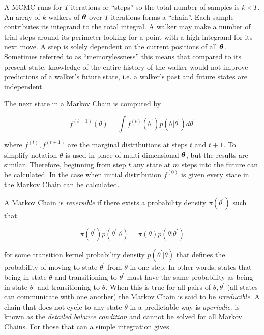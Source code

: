 A MCMC runs for $T$ iterations or ``steps'' so the total number of samples is $k \times T$.    An array of $k$ walkers of
$\boldsymbol{\theta}$ over $T$ iterations forms a ``chain''.  Each sample contributes its
integrand to the total integral.  A walker may make a number of trial steps around its perimeter looking for a point with a high
integrand for its next move.  A step is solely dependent on the current positions of all $\boldsymbol{\theta}$.  Sometimes referred to as
``memorylessness'' this means that compared to its present state, knowledge of the entire history of the walker would not improve
predictions of a walker's future state, i.e. a walker's past and future states are independent.

The next state in a Markov Chain is computed by

\begin{equation}
f^{(t + 1)} (\theta) = \int f^{(t)} (\theta^{\prime}) p(\theta|\theta^{\prime}) d\theta^{\prime}
\label{eq:er_nr_calibrations_parameter_determ_mcmc_marginal}
\end{equation}

\noindent where $f^{(t)}, f^{(t + 1)}$ are the marginal distributions at steps $t$ and $t + 1$.  To simplify notation $\theta$
is used in place of multi-dimensional $\boldsymbol{\theta}$, but the results are similar.  Therefore, beginning from step $t$ any state
at $m$ steps into the future can be calculated.  In the case when initial distribution $f^{(0)}$ is given every state in the Markov Chain can
be calculated.

A Markov Chain is \textit{reversible} if there exists a probability density $\pi (\theta^{\prime})$ such that

\begin{equation}
\pi (\theta^{\prime}) p(\theta^{\prime}|\theta) = \pi (\theta) p(\theta|\theta^{\prime})
\label{eq:er_nr_calibrations_parameter_determ_mcmc_detailed_balance}
\end{equation}

\noindent for some transition kernel probability density $p(\theta^{\prime}|\theta)$ that defines the probability of
moving to state $\theta^{\prime}$ from $\theta$ in one step.  In other words, 
 states that being in state $\theta$ and transitioning to
$\theta^{\prime}$ must have the same probability as being in state $\theta^{\prime}$ and transitioning to 
$\theta$.  When
this is true for all pairs of $\theta, \theta^{\prime}$ (all states can communicate with one another) the Markov Chain
is said to be \textit{irreducible}.  A chain that does not cycle to any state $\theta$ in a predictable way is
\textit{aperiodic}.  
is known as the \textit{detailed balance condition} and cannot be solved for all Markov Chains.  For those that can a simple integration
gives

